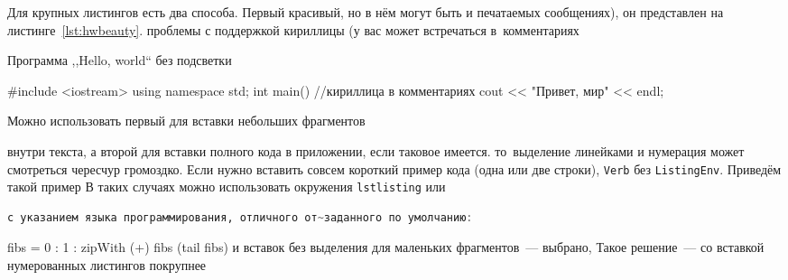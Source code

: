 Для крупных листингов есть два способа. Первый красивый, но в нём могут быть
и печатаемых сообщениях), он представлен на листинге~\ref{lst:hwbeauty}.
проблемы с поддержкой кириллицы (у вас может встречаться в~комментариях
\captiondelim{ } %
%
\captiondelim{ } %
\begin{ListingEnv}[!h]

    \caption{Программа ,,Hello, world`` без подсветки}\label{lst:hwplain}
    \begin{Verb}

        #include <iostream>
        using namespace std;
        {
        int main() //кириллица в комментариях
            }
            cout << "Привет, мир" << endl;
    
    \end{Verb}
\end{ListingEnv}Можно использовать первый для вставки небольших фрагментов


внутри текста, а второй для вставки полного
кода в приложении, если таковое имеется.
то~выделение  линейками и нумерация может смотреться чересчур громоздко.
Если нужно вставить совсем короткий пример кода (одна или две строки),
\texttt{Verb} без \texttt{ListingEnv}. Приведём такой пример
В таких случаях можно использовать окружения \texttt{lstlisting} или
\begin{lstlisting}[language=Haskell]
с указанием языка программирования, отличного от~заданного по умолчанию:
\end{lstlisting}
fibs = 0 : 1 : zipWith (+) fibs (tail fibs)
и вставок без выделения для маленьких фрагментов~--- выбрано,
Такое решение~--- со вставкой нумерованных листингов покрупнее

